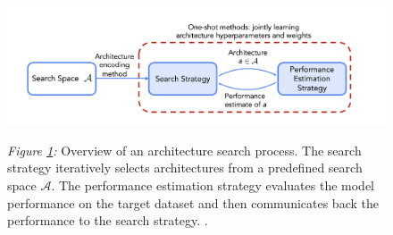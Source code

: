 \begin{figure}[htbp]
	\centering
	\includegraphics[scale=0.5]{figs/overview_nas.png}
	\label{fig: nas_overview}
	\parbox{\linewidth}{
	 \vspace{0.5em}
 	 {\small \textit{Figure \ref{fig: nas_overview}:} Overview of an architecture search process. The search strategy iteratively selects architectures from a predefined search space $\mathcal{A}$. The performance estimation strategy evaluates the model performance on the target dataset and then communicates back the performance to the search strategy.  \cite{white2023survey}.
	}
 	}
\end{figure}

